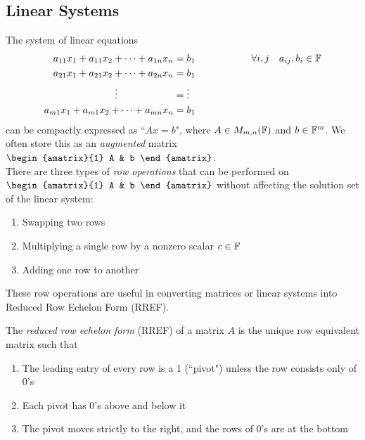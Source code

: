 \subsection{Linear Systems}
\label{subsection:linear-systems}
The system of linear equations
\begin{align*}
    a_{11}x_1 + a_{11}x_2 + \dots + a_{1n}x_n &= b_1 \hspace{2cm} \forall i,j \quad a_{ij}, b_i \in \mathbb F \\
    a_{21}x_1 + a_{21}x_2 + \dots + a_{2n}x_n &= b_1 \\
    \vdots \hspace{2cm} &= \vdots \\
    a_{m1}x_1 + a_{m1}x_2 + \dots + a_{mn}x_n &= b_1
\end{align*}
can be compactly expressed as ``$Ax = b$", where $A \in M_{m,n}(\mathbb F)$ and $b \in \mathbb F^m$. We often store this as an \textit{augmented} matrix $\begin{amatrix}{1} A & b \end{amatrix}$. \\

\noindent There are three types of \textit{row operations} that can be performed on $\begin{amatrix}{1} A & b \end{amatrix}$ without affecting the solution set of the linear system:
\begin{enumerate}
    \item Swapping two rows
    \item Multiplying a single row by a nonzero scalar $c \in \mathbb F$
    \item Adding one row to another
\end{enumerate}

\noindent These row operations are useful in converting matrices or linear systems into Reduced Row Echelon Form (RREF).

\begin{definition}
The \textit{reduced row echelon form} (RREF) of a matrix $A$ is the unique row equivalent matrix such that
\begin{enumerate}
    \item The leading entry of every row is a 1 (``pivot") unless the row consists only of 0's
    \item Each pivot has 0's above and below it
    \item The pivot moves strictly to the right, and the rows of 0's are at the bottom
\end{enumerate}
\end{definition}

